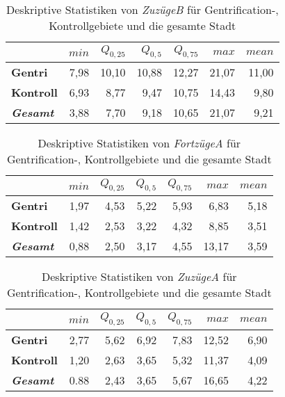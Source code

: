 \begin{table}[H]
\centering
\begin{tabular}{@{}lrrrrrr@{}}
\toprule
               & $min$ & $Q_{0,25}$ & $Q_{0,5}$ & $Q_{0,75}$ & $max$ & $mean$ \\ \midrule
{\bf Gentri}   & 7,98 & 10,10 & 10,88 & 12,27 & 21,07 & 11,00 \\
{\bf Kontroll} & 6,93 & 8,77 & 9,47 & 10,75 & 14,43 &  9,80  \\ \hdashline 
{\bf \textit{Gesamt}} & 3,88 & 7,70 & 9,18  & 10,65 & 21,07 & 9,21 \\ \bottomrule
\end{tabular}
\caption[Deskriptive Statistiken von \textit{ZuzügeB}]{Deskriptive Statistiken von \textit{ZuzügeB} für Gentrification-, Kontrollgebiete und die gesamte Stadt}
\label{tab:ZuzuegeR}
\end{table}

\begin{table}[H]
\centering
\begin{tabular}{@{}lrrrrrr@{}}
\toprule
               & $min$ & $Q_{0,25}$ & $Q_{0,5}$ & $Q_{0,75}$ & $max$ & $mean$ \\ \midrule
{\bf Gentri}   & 1,97 & 4,53 & 5,22 & 5,93 & 6,83  & 5,18 \\
{\bf Kontroll} & 1,42 & 2,53 & 3,22 & 4,32 & 8,85  & 3,51 \\ \hdashline 
{\bf \textit{Gesamt}} & 0,88 & 2,50 & 3,17 & 4,55  & 13,17 & 3,59 \\ \bottomrule
\end{tabular}
\caption[Deskriptive Statistiken von \textit{FortzügeA}]{Deskriptive Statistiken von \textit{FortzügeA} für Gentrification-, Kontrollgebiete und die gesamte Stadt}
\label{tab:FortzuegeUDAR}
\end{table}

\begin{table}[H]
\centering
\begin{tabular}{@{}lrrrrrr@{}}
\toprule
               & $min$ & $Q_{0,25}$ & $Q_{0,5}$ & $Q_{0,75}$ & $max$ & $mean$ \\ \midrule
{\bf Gentri}   & 2,77  & 5,62       & 6,92      & 7,83       & 12,52 & 6,90   \\
{\bf Kontroll} & 1,20  & 2,63       & 3,65      & 5,32       & 11,37 & 4,09   \\ \hdashline
{\bf \textit{Gesamt}}  & 0.88       & 2,43      & 3,65       & 5,67  & 16,65 & 4,22 \\ \bottomrule
\end{tabular}
\caption[Deskriptive Statistiken von \textit{ZuzügeA}]{Deskriptive Statistiken von \textit{ZuzügeA} für Gentrification-, Kontrollgebiete und die gesamte Stadt}
\label{tab:ZuzuegeUDAR}
\end{table}

